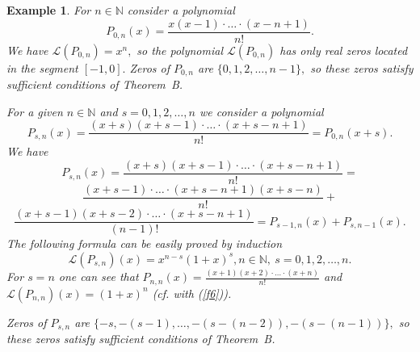 \documentclass[12pt]{amsart}
\newcounter{count}
\numberwithin{count}{section}
\newtheorem{Example}[count]{Example}
\begin{document}
\begin{Example}
\label{ex3}
 For $n \in \mathbb{N}$ consider a polynomial 
\begin{equation}
\label{f5}
P_{0,n}(x) = \frac{x(x-1)\cdot \ldots \cdot (x-n+1)}{n!}.
\end{equation}
We have $\mathcal{L}(P_{0,n}) = x^n,$ so the polynomial $\mathcal{L}(P_{0,n})$ has only real zeros located 
in the segment $[-1, 0].$ Zeros of $P_{0,n}$ are $\{0, 1, 2,  \ldots, n-1\},$ so these zeros satisfy
sufficient conditions of Theorem~B.

For a given $n \in \mathbb{N}$ and $s=0, 1, 2, \ldots, n$ we consider a polynomial
\begin{equation}
\label{f66}
P_{s,n}(x) = \frac{(x+s)(x+s-1)\cdot \ldots \cdot (x+s-n+1)}{n!} = P_{0,n}(x+s).
\end{equation}
We have
$$P_{s,n}(x) = \frac{(x+s)(x+s-1)\cdot \ldots \cdot (x+s-n+1)}{n!} =$$
 $$ \frac{(x+s-1)\cdot \ldots \cdot (x+s-n+1)(x+s-n)}{n!}  + $$
 $$ \frac{(x+s-1)(x+s-2)\cdot \ldots \cdot (x+s-n+1)}{(n-1)!} =   
 P_{s-1,n}(x) + P_{s,n-1}(x).$$
 The following formula can be easily proved by induction
\begin{equation}
\label{f67}
\mathcal{L} (P_{s,n})(x) = x^{n-s}(1+x)^s, n \in \mathbb{N},\  s=0, 1, 2, \ldots, n.
\end{equation}
For $s=n$ one can see that $P_{n,n}(x) =  \frac{(x+1)(x+2) \cdot 
\ldots \cdot (x+n)}{n!} $ and  $\mathcal{L} (P_{n,n})(x) = (1+x)^n $
(cf. with (\ref{f6})).

Zeros of $P_{s,n}$ are $\{ -s, -(s-1), \ldots, -(s-(n-2)), -(s-(n-1))\},$ so these zeros satisfy
sufficient conditions of Theorem~B.


\end{Example}
\end{document}
